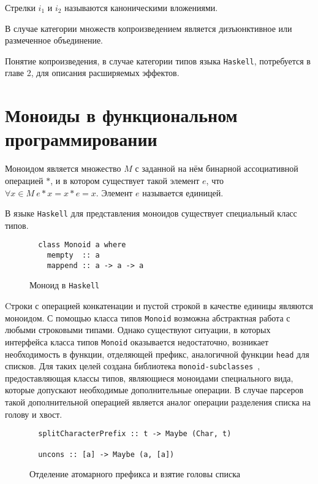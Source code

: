   Стрелки $i_1$ и $i_2$ называются каноническими вложениями.

  В случае категории множеств копроизведением является дизъюнктивное
  или размеченное объединение.

  Понятие копроизведения, в случае категории типов языка \lstinline{Haskell},
  потребуется в главе 2, для описания расширяемых эффектов.

\section{Моноиды в функциональном программировании}

  Моноидом является множество $M$ с заданной на нём бинарной ассоциативной
  операцией $*$, и в котором существует такой элемент
  $e$, что $\forall x \in M~e*x = x*e = x$. Элемент $e$ называется единицей.

  В языке \lstinline{Haskell} для представления моноидов существует специальный
  класс типов.

  \begin{figure}[h]
  \begin{lstlisting}
  class Monoid a where
    mempty  :: a
    mappend :: a -> a -> a
  \end{lstlisting}
  \caption{Моноид в \lstinline{Haskell}}
  \label{listing:Monoid}
  \end{figure}

  Cтроки с операцией конкатенации и пустой строкой в качестве единицы являются
  моноидом. С помощью класса типов \lstinline{Monoid} возможна абстрактная работа
  с любыми строковыми типами. Однако существуют ситуации, в которых интерфейса
  класса типов \lstinline{Monoid} оказывается недостаточно, возникает
  необходимость в функции, отделяющей префикс, аналогичной функции
  \lstinline{head} для списков. Для таких целей создана библиотека
  \lstinline{monoid-subclasses}~\cite{monoids}, предоставляющая
  классы типов, являющиеся моноидами специального вида, которые допускают
  необходимые дополнительные операции. В случае парсеров такой дополнительной
  операцией является аналог операции разделения списка на голову и хвост.

  \begin{figure}[h]
  \begin{lstlisting}
  splitCharacterPrefix :: t -> Maybe (Char, t)

  uncons :: [a] -> Maybe (a, [a])
  \end{lstlisting}
  \caption{Отделение атомарного префикса и взятие головы списка}
  \label{listing:Monoid}
  \end{figure}